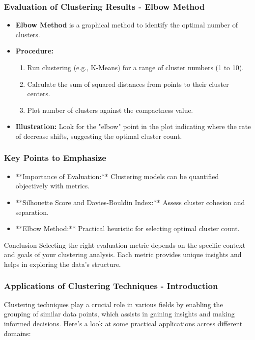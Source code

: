 \documentclass[aspectratio=169]{beamer}
\begin{document}
\begin{frame}[fragile]
    \frametitle{Evaluation of Clustering Results - Elbow Method}
    \begin{itemize}
        \item \textbf{Elbow Method} is a graphical method to identify the optimal number of clusters.
        \item \textbf{Procedure:}
        \begin{enumerate}
            \item Run clustering (e.g., K-Means) for a range of cluster numbers (1 to 10).
            \item Calculate the sum of squared distances from points to their cluster centers.
            \item Plot number of clusters against the compactness value.
        \end{enumerate}
        \item \textbf{Illustration:} Look for the "elbow" point in the plot indicating where the rate of decrease shifts, suggesting the optimal cluster count.
    \end{itemize}
\end{frame}

\begin{frame}[fragile]
    \frametitle{Key Points to Emphasize}
    \begin{itemize}
        \item **Importance of Evaluation:** Clustering models can be quantified objectively with metrics.
        \item **Silhouette Score and Davies-Bouldin Index:** Assess cluster cohesion and separation.
        \item **Elbow Method:** Practical heuristic for selecting optimal cluster count.
    \end{itemize}
    
    \begin{block}{Conclusion}
        Selecting the right evaluation metric depends on the specific context and goals of your clustering analysis. Each metric provides unique insights and helps in exploring the data's structure.
    \end{block}
\end{frame}

\begin{frame}[fragile]
    \frametitle{Applications of Clustering Techniques - Introduction}
    Clustering techniques play a crucial role in various fields by enabling the grouping of similar data points, which assists in gaining insights and making informed decisions. Here’s a look at some practical applications across different domains:
\end{frame}
\end{document}
